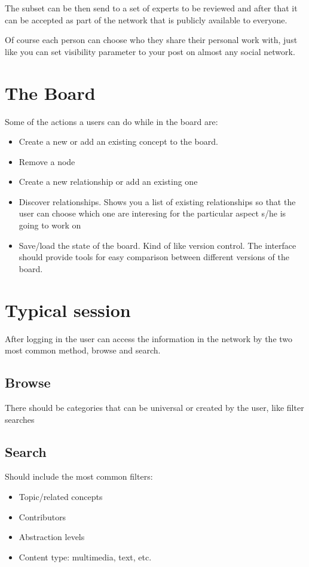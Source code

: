 The subset can be then send to a set of experts to 
be reviewed and after that it can be accepted as part of the 
network that is publicly available to everyone.

Of course each person can choose who they share their personal
work with, just like you can set visibility parameter to 
your post on almost any social network.

\section{The Board}
Some of the actions a users can do while in the board are:
\begin{itemize}
 \item Create a new or add an existing concept to the board.
 \item Remove a node
 \item Create a new relationship or add an existing one
 \item Discover relationships. Shows you a list of existing 
relationships so that the user can choose which one are interesing
for the particular aspect s/he is going to work on
\item Save/load the state of the board. Kind of like version control.
The interface should provide tools for easy comparison between different
versions of the board.
 
\end{itemize}


\section{Typical session}
After logging in the user can access the information in the network
by the two most common method, browse and search.

\subsection{Browse}
There should be categories that can be universal or created
by the user, like filter searches

\subsection{Search}
Should include the most common filters:
\begin{itemize}
 \item Topic/related concepts
 \item Contributors
 \item Abstraction levels
 \item Content type: multimedia, text, etc.
\end{itemize}

